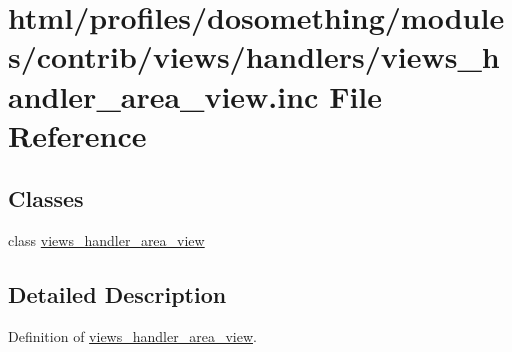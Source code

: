 \hypertarget{views__handler__area__view_8inc}{
\section{html/profiles/dosomething/modules/contrib/views/handlers/views\_\-handler\_\-area\_\-view.inc File Reference}
\label{views__handler__area__view_8inc}
}
\subsection*{Classes}
\begin{DoxyCompactItemize}
\item 
class \hyperlink{classviews__handler__area__view}{views\_\-handler\_\-area\_\-view}
\end{DoxyCompactItemize}


\subsection{Detailed Description}
Definition of \hyperlink{classviews__handler__area__view}{views\_\-handler\_\-area\_\-view}. 
